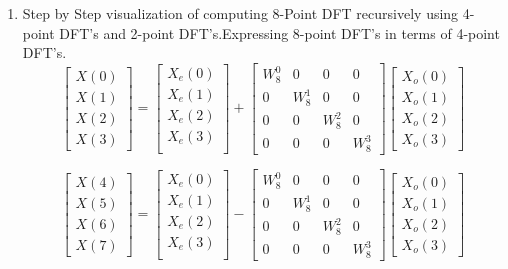 \documentclass[journal,12pt,twocolumn]{IEEEtran}
\renewcommand\thesection{\arabic{section}}
\begin{document}
\begin{enumerate}[label=\thesection.\arabic*.,ref=\thesection.\theenumi]
\item Step by Step visualization of computing 8-Point DFT recursively using 4-point DFT's and 2-point DFT's.Expressing 8-point DFT's in terms of 4-point DFT's.
\begin{equation}
\begin{bmatrix}
X(0) \\ 
X(1) \\ 
X(2) \\ 
X(3)
\end{bmatrix}
=
\begin{bmatrix}
X_{e}(0) \\ 
X_{e}(1)\\ 
X_{e}(2)\\
X_{e}(3)\\
\end{bmatrix}
+
\begin{bmatrix}
W^{0}_{8} & 0 & 0 & 0\\
0 & W^{1}_{8} & 0 & 0\\
0 & 0 & W^{2}_{8} & 0\\
0 & 0 & 0 & W^{3}_{8}
\end{bmatrix}
\begin{bmatrix}
X_{o}(0) \\ 
X_{o}(1) \\ 
X_{o}(2) \\
X_{o}(3)
\end{bmatrix}
\end{equation}

\begin{equation}
\begin{bmatrix}
X(4) \\ 
X(5) \\ 
X(6) \\ 
X(7)
\end{bmatrix}
=
\begin{bmatrix}
X_{e}(0) \\ 
X_{e}(1)\\ 
X_{e}(2)\\
X_{e}(3)\\
\end{bmatrix}
-
\begin{bmatrix}
W^{0}_{8} & 0 & 0 & 0\\
0 & W^{1}_{8} & 0 & 0\\
0 & 0 & W^{2}_{8} & 0\\
0 & 0 & 0 & W^{3}_{8}
\end{bmatrix}
\begin{bmatrix}
X_{o}(0) \\ 
X_{o}(1) \\ 
X_{o}(2) \\
X_{o}(3)
\end{bmatrix}
\end{equation}


\end{enumerate}
\end{document}
